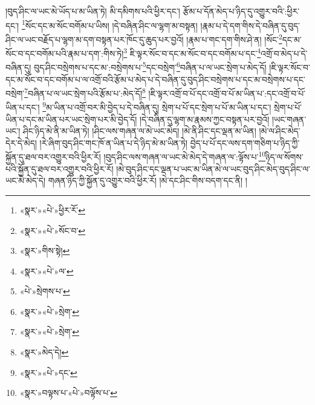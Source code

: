།བུད་ཤིང་ལ་ཡང་མེ་ཡོད་པ་མ་ཡིན་ཏེ། མི་དམིགས་པའི་ཕྱིར་དང་། རྩོམ་པ་དོན་མེད་པ་ཉིད་དུ་འགྱུར་བའི་:ཕྱིར་དང་། \footnote{«སྣར་»«པེ་»ཕྱིར་རོ་}སོང་དང་མ་སོང་བགོམ་པ་ཡིས། །དེ་བཞིན་ཤིང་ལ་ལྷག་མ་བསྟན། །རྣམ་པ་དེ་དག་གིས་དེ་བཞིན་དུ་བུད་ཤིང་ལ་ཡང་བརྗོད་པ་ལྷག་མ་དག་བསྟན་པར་ཁོང་དུ་ཆུད་པར་བྱའོ། །རྣམ་པ་གང་དག་གིས་ཤེ་ན། །སོང་\footnote{«སྣར་»«པེ་»སོང་བ་}དང་མ་སོང་བ་དང་བགོམ་པའི་རྣམ་པ་དག་:གིས་ཏེ།\footnote{«སྣར་»གིས་སྟེ།} ཇི་ལྟར་སོང་བ་དང་མ་སོང་བ་དང་བགོམ་པ་དང་\footnote{«སྣར་»«པེ་»ལ་}འགྲོ་བ་མེད་པ་དེ་བཞིན་དུ། བུད་ཤིང་བསྲེགས་པ་དང་མ་:བསྲེགས་པ་\footnote{«པེ་»སྲེགས་པ་}དང་བསྲེག་\footnote{«སྣར་»«པེ་»སྲེག་}བཞིན་པ་ལ་ཡང་སྲེག་པ་མེད་དོ། །ཇི་ལྟར་སོང་བ་དང་མ་སོང་བ་དང་བགོམ་པ་ལ་འགྲོ་བའི་རྩོམ་པ་མེད་པ་དེ་བཞིན་དུ་བུད་ཤིང་བསྲེགས་པ་དང་མ་བསྲེགས་པ་དང་བསྲེག་\footnote{«སྣར་»«པེ་»སྲེག་}བཞིན་པ་ལ་ཡང་སྲེག་པའི་རྩོམ་པ་:མེད་དོ།\footnote{«སྣར་»མེད་དེ།} །ཇི་ལྟར་འགྲོ་བ་པོ་དང་འགྲོ་བ་པོ་མ་ཡིན་པ་:དང་འགྲོ་བ་པོ་ཡིན་པ་དང་། \footnote{«སྣར་»«པེ་»དང་}མ་ཡིན་པ་འགྲོ་བར་མི་བྱེད་པ་དེ་བཞིན་དུ། སྲེག་པ་པོ་དང་སྲེག་པ་པོ་མ་ཡིན་པ་དང་། སྲེག་པ་པོ་ཡིན་པ་དང་མ་ཡིན་པར་ཡང་སྲེག་པར་མི་བྱེད་དོ། །དེ་བཞིན་དུ་ལྷག་མ་རྣམས་ཀྱང་བསྟན་པར་བྱའོ། །ཡང་གཞན་ཡང་། ཤིང་ཉིད་མེ་ནི་མ་ཡིན་ཏེ། །ཤིང་ལས་གཞན་ལ་མེ་ཡང་མེད། །མེ་ནི་ཤིང་དང་ལྡན་མ་ཡིན། །མེ་ལ་ཤིང་མེད་དེར་དེ་མེད། །རེ་ཞིག་བུད་ཤིང་གང་ཁོ་ན་ཡིན་པ་དེ་ཉིད་མེ་མ་ཡིན་ཏེ། བྱེད་པ་པོ་དང་ལས་དག་གཅིག་པ་ཉིད་ཀྱི་སྐྱོན་དུ་ཐལ་བར་འགྱུར་བའི་ཕྱིར་རོ། །བུད་ཤིང་ལས་གཞན་ལ་ཡང་མེ་མེད་དེ་གཞན་ལ་:ལྟོས་པ་\footnote{«སྣར་»བལྟས་པ་«པེ་»བལྟོས་པ་}ཉིད་ལ་སོགས་པའི་སྐྱོན་དུ་ཐལ་བར་འགྱུར་བའི་ཕྱིར་རོ། །མེ་བུད་ཤིང་དང་ལྡན་པ་ཡང་མ་ཡིན་མེ་ལ་ཡང་བུད་ཤིང་མེད་བུད་ཤིང་ལ་ཡང་མེ་མེད་དེ། གཞན་ཉིད་ཀྱི་སྐྱོན་དུ་འགྱུར་བའི་ཕྱིར་རོ། །མེ་དང་ཤིང་གིས་བདག་དང་ནི། །
